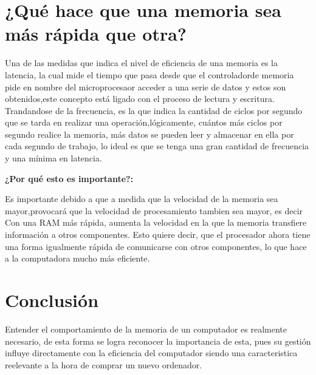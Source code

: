 \documentclass{article}
\begin{document}
\section{¿Qué hace que una memoria sea más rápida que otra?} \label{contenido}


Una de las medidas que indica el nivel de eficiencia de una memoria es la latencia, la cual mide el tiempo que pasa desde que el controladorde memoria pide en nombre del microprocesaor acceder a una serie de datos y estos son obtenidos,este concepto está ligado con el proceso de lectura y escritura.
Trandandose de la frecuencia, es la que  indica la cantidad de ciclos por segundo que se tarda en realizar una operación,lógicamente, cuántos más ciclos por segundo realice la memoria, más datos se pueden leer y almacenar
en ella por cada segundo de trabajo, lo ideal es  que se tenga una gran cantidad de frecuencia y una mínima en latencia.
\cite{knuthwebsite}


\textbf{¿Por qué esto es importante?:}

Es importante debido a que a medida que la velocidad de la memoria sea mayor,provocará que la velocidad de procesamiento tambien sea mayor, es decir
Con una RAM más rápida, aumenta la velocidad en la que la memoria transfiere información a otros componentes. Esto quiere decir, que el procesador ahora tiene una forma igualmente rápida de comunicarse con otros componentes, lo que hace a la computadora mucho más eficiente.


\section{Conclusión} \label{conclulsion}

Entender el comportamiento de la memoria de un computador es realmente necesario, de esta forma se logra reconocer la importancia de esta, pues su gestión influye directamente con la eficiencia del computador siendo una caracteristica reelevante a la hora de comprar un nuevo ordenador.  



\end{document}
